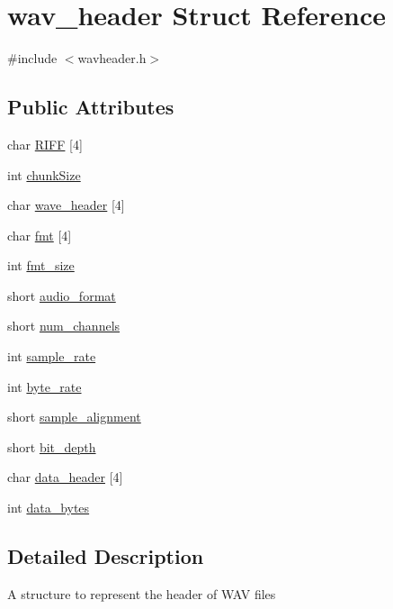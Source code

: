 \hypertarget{structwav__header}{}\section{wav\+\_\+header Struct Reference}
\label{structwav__header}


{\ttfamily \#include $<$wavheader.\+h$>$}

\subsection*{Public Attributes}
\begin{DoxyCompactItemize}
\item 
char \hyperlink{structwav__header_a922454e449922ac5dd868afac8f883da}{R\+I\+FF} \mbox{[}4\mbox{]}
\item 
int \hyperlink{structwav__header_af71680c0a1a1a432de36737e56153894}{chunk\+Size}
\item 
char \hyperlink{structwav__header_a0dc0cff34ad7fe5e59c5cbcee1640354}{wave\+\_\+header} \mbox{[}4\mbox{]}
\item 
char \hyperlink{structwav__header_ad766f550ae18a908d86ba1e72899b4b8}{fmt} \mbox{[}4\mbox{]}
\item 
int \hyperlink{structwav__header_a92e6134a93f1c2c7d8084fadc7645823}{fmt\+\_\+size}
\item 
short \hyperlink{structwav__header_a94c9ee0387f846c47eb9e97636994d93}{audio\+\_\+format}
\item 
short \hyperlink{structwav__header_a625d84de0f598e50c072d725f6e3b6b8}{num\+\_\+channels}
\item 
int \hyperlink{structwav__header_a0632019c676aa88f0351c0ab11461de0}{sample\+\_\+rate}
\item 
int \hyperlink{structwav__header_a8330740d45200d6aee4ba54fc0d834d8}{byte\+\_\+rate}
\item 
short \hyperlink{structwav__header_a2672b73c81973008677db6349fbc232a}{sample\+\_\+alignment}
\item 
short \hyperlink{structwav__header_a63fa60069060bae97c8a64c5b37afa23}{bit\+\_\+depth}
\item 
char \hyperlink{structwav__header_ae43fac12459053e98a80e3879c5cd2a7}{data\+\_\+header} \mbox{[}4\mbox{]}
\item 
int \hyperlink{structwav__header_a3eeeca270947eab7c7aaee61bbee9b0e}{data\+\_\+bytes}
\end{DoxyCompactItemize}


\subsection{Detailed Description}
A structure to represent the header of W\+AV files 

